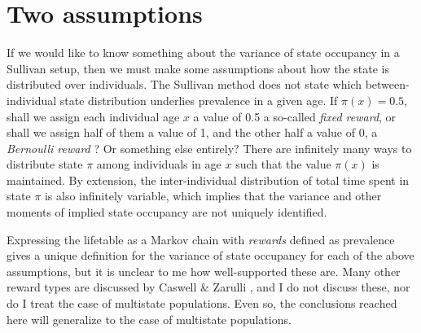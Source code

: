 \documentclass{bmcart}
\begin{document}
\section*{Two assumptions}
If we would like to know something about the variance of state occupancy in a Sullivan setup, then we must make some assumptions about how the state is distributed over individuals. The Sullivan method does not state which between-individual state distribution underlies prevalence in a given age. If $\pi(x) = 0.5$, shall we assign each individual age $x$ a value of 0.5 a so-called \emph{fixed reward}, or shall we assign half of them a value of 1, and the other half a value of 0, a \emph{Bernoulli reward} \citep{caswell2018matrix}? Or something else entirely? There are infinitely many ways to distribute state $\pi$ among individuals in age $x$ such that the value $\pi(x)$ is maintained. By extension, the inter-individual distribution of total time spent in state $\pi$ is also infinitely variable, which implies that the variance and other moments of implied state occupancy are not uniquely identified. 

Expressing the lifetable as a Markov chain with \emph{rewards} defined as prevalence gives a unique definition for the variance of state occupancy for each of the above assumptions, but it is unclear to me how well-supported these are. Many other reward types are discussed by Caswell \& Zarulli \cite{caswell2018matrix}, and I do not discuss these, nor do I treat the case of multistate populations. Even so, the conclusions reached here will generalize to the case of multistate populations.

\end{document}
